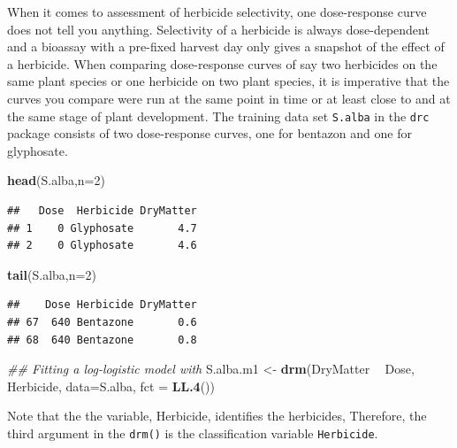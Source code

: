\documentclass[letterpaper,]{book}
\newenvironment{Shaded}{\begin{snugshade}}{\end{snugshade}}
\newcommand{\CommentTok}[1]{\textcolor[rgb]{0.56,0.35,0.01}{\textit{#1}}}
\newcommand{\DataTypeTok}[1]{\textcolor[rgb]{0.13,0.29,0.53}{#1}}
\newcommand{\DecValTok}[1]{\textcolor[rgb]{0.00,0.00,0.81}{#1}}
\newcommand{\KeywordTok}[1]{\textcolor[rgb]{0.13,0.29,0.53}{\textbf{#1}}}
\newcommand{\NormalTok}[1]{#1}
\newcommand{\OperatorTok}[1]{\textcolor[rgb]{0.81,0.36,0.00}{\textbf{#1}}}
\newcommand{\StringTok}[1]{\textcolor[rgb]{0.31,0.60,0.02}{#1}}
\begin{document}
When it comes to assessment of herbicide selectivity, one dose-response curve does not tell you anything. Selectivity of a herbicide is always dose-dependent and a bioassay with a pre-fixed harvest day only gives a snapshot of the effect of a herbicide. When comparing dose-response curves of say two herbicides on the same plant species or one herbicide on two plant species, it is imperative that the curves you compare were run at the same point in time or at least close to and at the same stage of plant development. The training data set \texttt{S.alba} in the \texttt{drc} package consists of two dose-response curves, one for bentazon and one for glyphosate.

\begin{Shaded}
\begin{Highlighting}[]
\KeywordTok{head}\NormalTok{(S.alba,}\DataTypeTok{n=}\DecValTok{2}\NormalTok{)}
\end{Highlighting}
\end{Shaded}

\begin{verbatim}
##   Dose  Herbicide DryMatter
## 1    0 Glyphosate       4.7
## 2    0 Glyphosate       4.6
\end{verbatim}

\begin{Shaded}
\begin{Highlighting}[]
\KeywordTok{tail}\NormalTok{(S.alba,}\DataTypeTok{n=}\DecValTok{2}\NormalTok{)}
\end{Highlighting}
\end{Shaded}

\begin{verbatim}
##    Dose Herbicide DryMatter
## 67  640 Bentazone       0.6
## 68  640 Bentazone       0.8
\end{verbatim}

\begin{Shaded}
\begin{Highlighting}[]
\CommentTok{## Fitting a log-logistic model with}
\NormalTok{S.alba.m1 <-}\StringTok{ }\KeywordTok{drm}\NormalTok{(DryMatter }\OperatorTok{~}\StringTok{ }\NormalTok{Dose, Herbicide, }\DataTypeTok{data=}\NormalTok{S.alba, }\DataTypeTok{fct =} \KeywordTok{LL.4}\NormalTok{())}
\end{Highlighting}
\end{Shaded}

Note that the the variable, Herbicide, identifies the herbicides, Therefore, the third argument in the \texttt{drm()} is the classification variable \texttt{Herbicide}.
\end{document}
